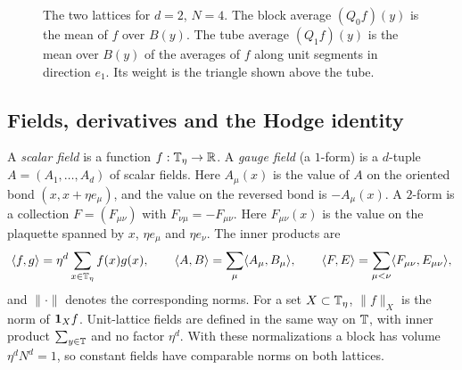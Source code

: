\begin{figure}[t]
\centering
{}
\caption{The two lattices for $d=2$, $N=4$. The block average $(Q_0f)(y)$ is the mean of $f$ over $B(y)$. The tube average $(Q_1f)(y)$ is the mean over $B(y)$ of the averages of $f$ along unit segments in direction $e_1$. Its weight is the triangle shown above the tube.}
\label{fig:lattices}
\end{figure}

\subsection{Fields, derivatives and the Hodge identity}

A \emph{scalar field} is a function $f:\mathbb T_\eta\to\mathbb R$. A \emph{gauge field} (a $1$-form) is a $d$-tuple $A=(A_1,\dots,A_d)$ of scalar fields. Here $A_\mu(x)$ is the value of $A$ on the oriented bond $(x,x+\eta e_\mu)$, and the value on the reversed bond is $-A_\mu(x)$. A $2$-form is a collection $F=(F_{\mu\nu})$ with $F_{\nu\mu}=-F_{\mu\nu}$. Here $F_{\mu\nu}(x)$ is the value on the plaquette spanned by $x$, $\eta e_\mu$ and $\eta e_\nu$. The inner products are
\[
\langle f,g\rangle=\eta^d\sum_{x\in\mathbb T_\eta}f(x)g(x),\qquad
\langle A,B\rangle=\sum_{\mu}\langle A_\mu,B_\mu\rangle,\qquad
\langle F,E\rangle=\sum_{\mu<\nu}\langle F_{\mu\nu},E_{\mu\nu}\rangle,
\]
and $\|\cdot\|$ denotes the corresponding norms. For a set $X\subset\mathbb T_\eta$, $\|f\|_X$ is the norm of $\mathbf 1_Xf$. Unit-lattice fields are defined in the same way on $\mathbb T$, with inner product $\sum_{y\in\mathbb T}$ and no factor $\eta^d$. With these normalizations a block has volume $\eta^dN^d=1$, so constant fields have comparable norms on both lattices.

